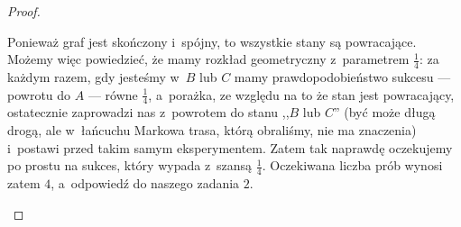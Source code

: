 \begin{proof}
\begin{enumerate}[label=(\roman*)]
		      Ponieważ graf jest skończony i~spójny, to wszystkie stany są powracające. Możemy więc powiedzieć, że mamy rozkład geometryczny z~parametrem \(\frac{1}{4}\): za każdym razem, gdy jesteśmy w~\(B\) lub \(C\) mamy prawdopodobieństwo sukcesu --- powrotu do \(A\) --- równe \(\frac{1}{4}\), a~porażka, ze względu na to że stan jest powracający, ostatecznie zaprowadzi nas z~powrotem do stanu ,,\(B\) lub \(C\)'' (być może długą drogą, ale w~łańcuchu Markowa trasa, którą obraliśmy, nie ma znaczenia) i~postawi przed takim samym eksperymentem. Zatem tak naprawdę oczekujemy po prostu na sukces, który wypada z~szansą \(\frac{1}{4}\). Oczekiwana liczba prób wynosi zatem \(4\), a~odpowiedź do naszego zadania \(2\).
	\end{enumerate}
\end{proof}

